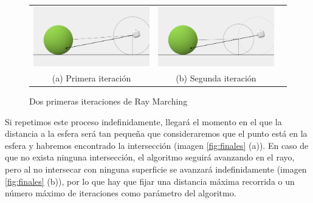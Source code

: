 \begin{figure}[ht]
    \centering
    \begin{tabular}{ccc}
      \includegraphics[scale=0.17]{img/C8/ray-marching-1.png} &     \includegraphics[scale=0.17]{img/C8/ray-marching-2.png} \\
    (a) Primera iteración & (b) Segunda iteración \\[6pt]
    \end{tabular}
    \caption{Dos primeras iteraciones de Ray Marching}
    \label{fig:iteraciones-RM}
\end{figure}

Si repetimos este proceso indefinidamente, llegará el momento en el que la distancia a la esfera será tan pequeña que consideraremos que el punto está en la esfera y habremos encontrado la intersección (imagen \ref{fig:finales} (a)). En caso de que no exista ninguna intersección, el algoritmo seguirá avanzando en el rayo, pero al no intersecar con ninguna superficie se avanzará indefinidamente (imagen \ref{fig:finales} (b)), por lo que hay que fijar una distancia máxima recorrida o un número máximo de iteraciones como parámetro del algoritmo.

